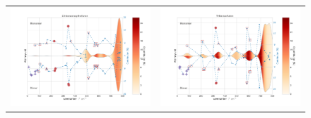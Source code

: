 \begin{figure}[H]
\begin{center}
{\begin{tabular}{c c}
					\includegraphics[scale=0.3]{image/P2-17c1} & \includegraphics[scale=0.3]{image/P2-17c}\\

\end{tabular}}
\end{center}
\end{figure}
